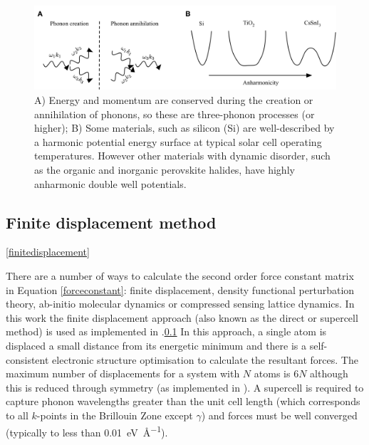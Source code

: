 \begin{figure}[h]
\centering
  \includegraphics[resolution=350]{figures/ch3/anharmonicity.png}
  \caption[3-phonon processes and anharmonic potential energy surfaces]{A) Energy and momentum are conserved during the creation or annihilation of phonons, so these are three-phonon processes (or higher); B) Some materials, such as silicon (Si) are well-described by a harmonic potential energy surface at typical solar cell operating temperatures. However other materials with dynamic disorder, such as the organic and inorganic perovskite halides, have highly anharmonic double well potentials.}
  \label{harmonicregime}
\end{figure}  %



\subsection{Finite displacement method} \ref{finitedisplacement}

There are a number of ways to calculate the second order force constant matrix in Equation \ref{forceconstant}: finite displacement, density functional perturbation theory, ab-initio molecular dynamics or compressed sensing lattice dynamics.
In this work the finite displacement approach (also known as the direct or supercell method) is used as implemented in .\ref{} 
In this approach, a single atom is displaced a small distance from its energetic minimum and there is a self-consistent electronic structure optimisation to calculate the resultant forces. The maximum number of displacements for a system with $N$ atoms is $6N$ although this is reduced through symmetry (as implemented in ). 
A supercell is required to capture phonon wavelengths greater than the unit cell length (which corresponds to all $k$-points in the Brillouin Zone except $\gamma$) and forces must be well converged (typically to less than \SI{0.01}{\electronvolt\per\angstrom}).

